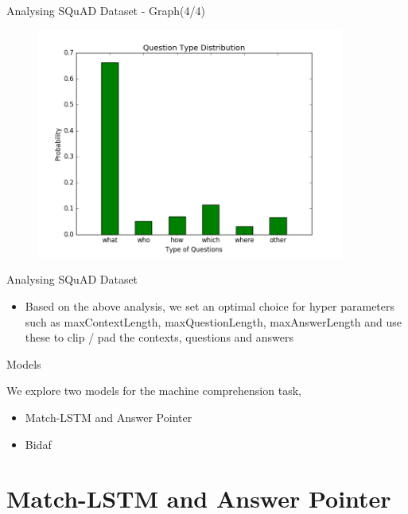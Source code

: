 \documentclass[10pt]{beamer}
\begin{document}
\begin{frame}[fragile]{Analysing SQuAD Dataset - Graph(4/4)}

	\begin{figure}[H]
		\centering
		{\includegraphics[width=0.9\textwidth]{includes/dist2.png}\label{fig:f1}}
	\end{figure}
\end{frame}

\begin{frame}[fragile]{Analysing SQuAD Dataset}

	\begin{itemize}
		\item Based on the above analysis, we set an optimal choice for hyper parameters such as maxContextLength, maxQuestionLength, maxAnswerLength and use these to clip / pad the contexts, questions and answers
	\end{itemize}
\end{frame}

\begin{frame}[fragile]{Models}

	We explore two models for the machine comprehension task,
	\pause
	\begin{itemize}[<+- | @alert->]
		\item Match-LSTM and Answer Pointer
		\item Bidaf
	\end{itemize}
\end{frame}

\section{Match-LSTM and Answer Pointer}
\end{document}
